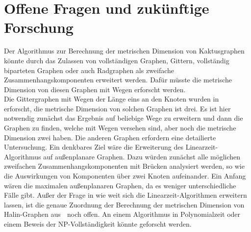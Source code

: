 \section{Offene Fragen und zukünftige Forschung}
\vspace{-2mm}
Der Algorithmus zur Berechnung der metrischen Dimension von Kaktusgraphen könnte durch das Zulassen von vollständigen Graphen, Gittern, vollständig biparteten Graphen oder auch Radgraphen als zweifache Zusammenhangskomponenten erweitert werden. Dafür müsste die metrische Dimension von diesen Graphen mit Wegen erforscht werden.\\ Die Gittergraphen mit Wegen der Länge eins an den Knoten wurden in \grqq$\;$\cite{grid} erforscht, die metrische Dimension von solchen Graphen ist drei. Es ist hier notwendig zunächst das Ergebnis auf beliebige Wege zu erweitern und dann die Graphen zu finden, welche mit Wegen versehen sind, aber noch die metrische Dimension zwei haben. Die anderen Graphen erfordern eine detailierte Untersuchung.
\vspace{-1.5mm}\newline\newline
Ein denkbares Ziel wäre die Erweiterung des Linearzeit-Algorithmus auf außenplanare Graphen. Dazu würden zunächst alle möglichen zweifachen Zusammenhangskomponenten mit Brücken analysiert werden, so wie die Auswirkungen von Komponenten über zwei Knoten aufeinander. Ein Anfang wären die maximalen außenplanaren Graphen, da es weniger unterschiedliche Fälle gibt.
\vspace{-1.5mm}\newline\newline
Außer der Frage in wie weit sich die Linearzeit-Algorithmen erweitern lassen, ist die genaue Zuordnung der Berechnung der metrischen Dimension von Halin-Graphen aus \grqq$\;$\cite{halin} noch offen. An einem Algorithmus in Polynomialzeit oder einem Beweis der NP-Vollständigkeit könnte geforscht werden.


\clearpage


\clearpage
\listoffigures
\listoftables

